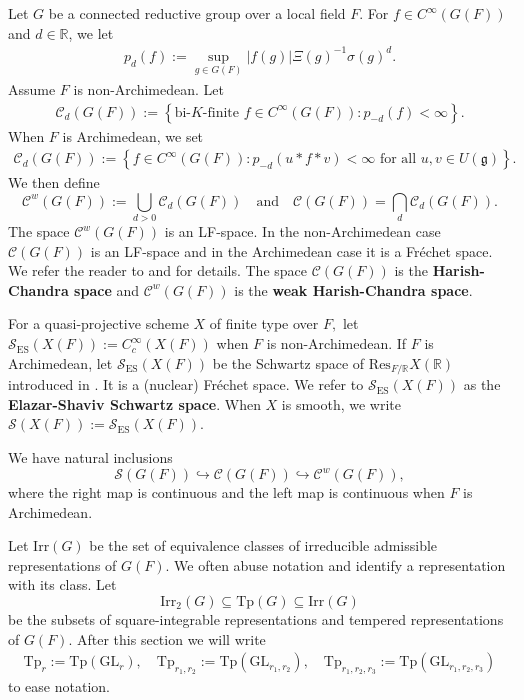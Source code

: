 \documentclass[12pt]{amsart}
\theoremstyle{remark}
\numberwithin{equation}{section}
\newcommand{\GL}{\mathrm{GL}}
\newcommand{\RR}{\mathbb{R}}
\theoremstyle{definition}
\numberwithin{equation}{subsection}
\begin{document}
Let $G$ be a connected reductive group over a local field $F.$ For  $f\in C^\infty(G(F))$ and $d\in \RR$, we let
\begin{align*}
    p_d(f):=\sup_{g\in G(F)} |f(g)|\Xi(g)^{-1}\sigma(g)^d.
\end{align*}
Assume $F$ is non-Archimedean.  Let 
\begin{align*}
\mathcal{C}_{d}( G(F)):=\left\{\textrm{bi-}K\textrm{-finite }f \in C^\infty( G(F)):p_{-d}(f)<\infty\right\}.
\end{align*} 
When $F$ is Archimedean, we set 
\begin{align*}
\mathcal{C}_d(G(F)):=\left\{f \in C^\infty(G(F)): p_{-d}(u*f*v)<\infty \textrm{ for all }u,v \in U(\mathfrak{g})\right\}.
\end{align*}
We then define 
$$
\mathcal{C}^w(G(F)):=\bigcup_{d>0}\mathcal{C}_d(G(F)) \quad\text{and}\quad \mathcal{C}(G(F))=\bigcap_d \mathcal{C}_d(G(F)).
$$
The space $\mathcal{C}^w(G(F))$ is an LF-space. In the non-Archimedean case $\mathcal{C}(G(F))$ is an LF-space and in the Archimedean case it is a Fr\'echet space.  We refer the reader to \cite[\S 1.5]{BP:Ast} and \cite[\S 2.4]{BP:GLn} for details.  The space $\mathcal{C}(G(F))$ is the \textbf{Harish-Chandra space} and $\mathcal{C}^w(G(F))$ is the \textbf{weak Harish-Chandra space}.


For a quasi-projective scheme $X$ of finite type over $F,$ let $\mathcal{S}_{\mathrm{ES}}(X(F)):=C_c^\infty(X(F))$ when $F$ is non-Archimedean.  If $F$ is Archimedean, let $\mathcal{S}_{\mathrm{ES}}(X(F))$ be the Schwartz space of $\mathrm{Res}_{F/\RR} X(\RR)$ introduced in \cite{Elazar:Shaviv}. It is a (nuclear) Fr\'echet space. We refer to $\mathcal{S}_{\mathrm{ES}}(X(F))$ as the \textbf{Elazar-Shaviv Schwartz space}. When $X$ is smooth, we write $\mathcal{S}(X(F)):=\mathcal{S}_{\mathrm{ES}}(X(F)).$ 


We have natural inclusions
$$
\mathcal{S}(G(F)) \hookrightarrow  \mathcal{C}(G(F)) \hookrightarrow \mathcal{C}^w(G(F)),
$$
where the right map is continuous and the left map is continuous when $F$ is Archimedean.




Let $\mathrm{Irr}(G)$ be the set of equivalence classes of irreducible admissible representations of $G(F).$   
We often abuse notation and identify a representation with its class. Let 
$$
\mathrm{Irr}_2(G) \subseteq \mathrm{Tp}(G) \subseteq \mathrm{Irr}(G)
$$
be the subsets of square-integrable representations and tempered representations of $G(F)$.   
After this section we will write
\begin{align*}
\mathrm{Tp}_r:=\mathrm{Tp}(\GL_r), \quad \mathrm{Tp}_{r_1,r_2}:=\mathrm{Tp}(\GL_{r_1,r_2}), \quad \mathrm{Tp}_{r_1,r_2,r_3}:=\mathrm{Tp}(\GL_{r_1,r_2,r_3})
\end{align*}
to ease notation.
\end{document}
